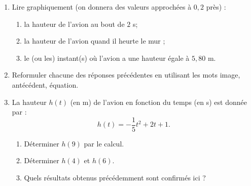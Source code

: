 \documentclass[a4paper]{article}
\begin{document}
\begin{enumerate}
  \item Lire graphiquement (on donnera des valeurs approchées à $0,2$ près) :
    \begin{enumerate}
      \item la hauteur de l'avion au bout de $2$ s;
      \item la hauteur de l'avion quand il heurte le mur ;
      \item le (ou les) instant(s) où l'avion a une hauteur égale à $5,80$ m.
    \end{enumerate}
  \item Reformuler chacune des réponses précédentes en utilisant les mots \og{}image\fg{}, \og{}antécédent\fg{}, \og{}équation\fg{}.
  \item La hauteur $h(t)$ (en m) de l'avion en fonction du temps (en s) est donnée par : 
    \[h(t)=-\dfrac{1}{5}t^2+2t+1.\]
    \begin{enumerate}
      \item Déterminer $h(9)$ par le calcul.
      \item Déterminer $h(4)$ et $h(6)$.
      \item Quels résultats obtenus précédemment sont confirmés ici ?
    \end{enumerate}
\end{enumerate}
\end{document}
